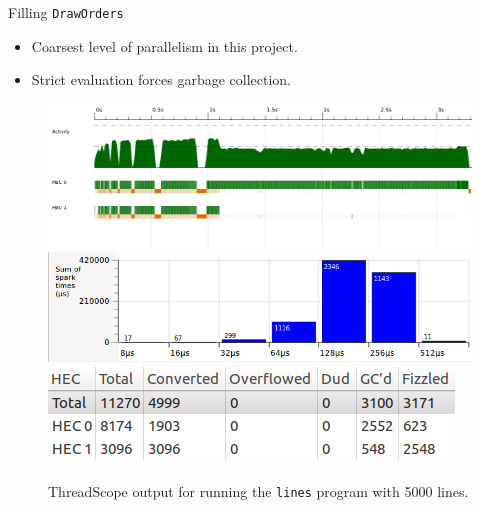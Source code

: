 \documentclass[slidestop,compress,mathserif, xcolor=table]{beamer}
\begin{document}
\begin{frame}[c]{Filling \texttt{DrawOrders}}
  \begin{itemize}
  \item Coarsest level of parallelism in this project.
  \item Strict evaluation forces garbage collection.
  \end{itemize}
 \begin{figure}[h!]
  \centering
  \includegraphics[width=0.7\linewidth,trim={0cm 2cm 0 0},clip]{../threadscope/fillorder/lines}\\
  \includegraphics[width=0.3\linewidth,height=0.15\textheight,trim={0 0 0 0},clip]{../threadscope/fillorder/lines-spark-sizes}
    \includegraphics[width=0.4\linewidth,height=0.15\textheight,trim={0 0 0 0},clip]{../threadscope/fillorder/lines-spark}
  \caption{ThreadScope output for running the \texttt{lines} program with 5000 lines.}
\end{figure}
\end{frame}
\end{document}
